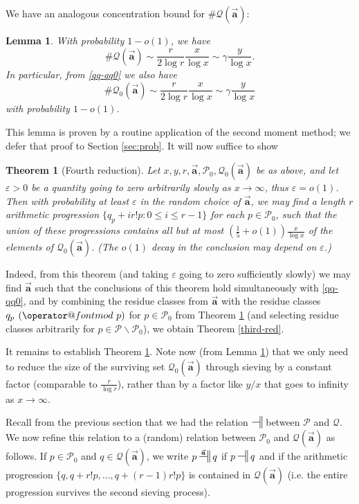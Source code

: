 \documentclass[11pt]{amsart}
\makeatletter
\numberwithin{equation}{section}  %
\theoremstyle{remark}
\theoremstyle{plain}
\newtheorem{lem}{Lemma}[section]
\newtheorem{thm}{Theorem}
\numberwithin{equation}{section}
\renewcommand{\pmod}[1]{\allowbreak\mkern7mu({\operator@font mod}\,\,#1)}
\newcommand{\eps}{\ensuremath{\varepsilon}}
\renewcommand{\leq}{\leqslant}
\renewcommand{\(}{\left(}
\renewcommand{\)}{\right)}
\newcommand{\asym}{\sim}   %
\newcommand{\relr}{\nsdtstile{}{}} %
\newcommand{\relra}{\nsdtstile{}{\vect{\mathbf{a}}}} %
\newcommand{\vect}[1]{{\ensuremath{\vec{#1}}}}
\newcommand{\PP}{\mathcal{P}}
\newcommand{\QQ}{\mathcal{Q}}
\makeatother
\begin{document}
We have an analogous concentration bound for $\# \QQ(\vect{\mathbf{a}})$:

\begin{lem}\label{QQ1_normal}  With probability $1-o(1)$, we have
$$ \# \QQ(\vect{\mathbf{a}}) \asym \frac{r}{2\log r} \frac{x}{\log x} \asym \gamma \frac{y}{\log x}.$$
In particular, from \eqref{qq-qq0} we also have
$$ \# \QQ_0(\vect{\mathbf{a}}) \asym \frac{r}{2\log r} \frac{x}{\log x} \asym \gamma \frac{y}{\log x}$$
with probability $1-o(1)$.
\end{lem}

This lemma is proven by a routine application of the second moment method; we defer that proof to Section \ref{sec:prob}.  It will now suffice to show

\begin{thm}[Fourth reduction]\label{fourth-red}  Let
  $x,y,r,\vect{\mathbf{a}},\PP_0,\QQ_0(\vect{\mathbf{a}})$ be as
  above, and let $\eps > 0$ be a quantity going to zero arbitrarily
  slowly as $x \to \infty$, thus $\eps = o(1)$.  Then with probability
  at least $\eps$ in the random choice of $\vect{\mathbf{a}}$, 
we may find a length $r$  arithmetic progression $\{ q_p + i r! p: 0
\leq i \leq r-1\}$ for each $p \in \PP_0$, such that the union of
these progressions contains all but at most $(\frac{1}{5} + o(1)) \frac{x}{\log x}$ of the elements of $\QQ_0(\vect{\mathbf{a}})$.  (The $o(1)$ decay in the conclusion may depend on $\eps$.)
\end{thm}

Indeed, from this theorem (and taking $\eps$ going to zero sufficiently slowly) we may find $\vect{\mathbf{a}}$ such that the conclusions of this theorem hold simultaneously with \eqref{qq-qq0}, and by combining the residue classes from $\vect{\mathbf{a}}$ with the residue classes $q_p \pmod{p}$ for $p \in \PP_0$ from Theorem \ref{fourth-red} (and selecting residue classes arbitrarily for $p \in \PP \backslash \PP_0$), we obtain Theorem \ref{third-red}.

It remains to establish Theorem \ref{fourth-red}.  Note now (from Lemma \ref{QQ1_normal}) that we only need to reduce the size of the surviving set $\QQ_0(\vect{\mathbf{a}})$ through sieving by a constant factor (comparable to $\frac{r}{\log r}$), rather than by a factor like $y/x$ that goes to infinity as $x \to \infty$.

Recall from the previous section that we had the relation $\relr$ between $\PP$ and $\QQ$.  We now refine this relation to a (random) relation between $\PP_0$ and $\QQ(\vect{\mathbf{a}})$ as follows.  If $p \in \PP_0$ and $q \in \QQ(\vect{\mathbf{a}})$, we write $p \relra q$ if $p \relr q$ and if the arithmetic progression $\{ q, q+r!p, \dots, q+(r-1)r!p \}$ is contained in $\QQ(\vect{\mathbf{a}})$ (i.e. the entire progression survives the second sieving process).  
\end{document}
